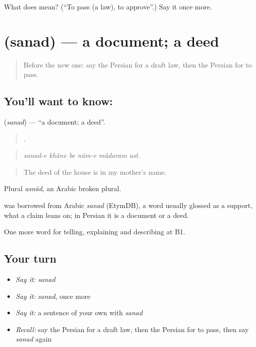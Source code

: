 \begin{tcolorbox}[breakable,colback=teal!4,colframe=teal!35!black,title={Before you move on}]
What does   mean? (\textquotedblleft{}To pass (a law), to approve\textquotedblright{}.) Say it once more.
\end{tcolorbox}
\section[\texorpdfstring{\fa{سند} (sanad)}{سند (sanad)}]{ (sanad) — a document; a deed}

\label{lesson:FA-C410-sanad}



\begin{quote}
Before the new one: say the Persian for a draft law, then the Persian for to pass.
\end{quote}

\subsection*{You'll want to know: }
\textbf{} (\emph{sanad}) — \textquotedblleft{}a document; a deed\textquotedblright{}.

\begin{quote}
     .
\end{quote}

\begin{quote}
\emph{sanad-e khâne be nâm-e mâdaram ast.}
\end{quote}

\begin{quote}
The deed of the house is in my mother's name.
\end{quote}

Plural \emph{asnâd}, an Arabic broken plural.

\begin{cousinweb}
\textbf{} was borrowed from Arabic \emph{sanad} (EtymDB), a word usually glossed as a support, what a claim leans on; in Persian it is a document or a deed.
\end{cousinweb}

\begin{grammarlens}[title={What you've built}]
One more word for telling, explaining and describing at B1.
\end{grammarlens}

\subsection*{Your turn}
\begin{itemize}
\raggedright
  \item \emph{Say it:} \emph{sanad}
  \item \emph{Say it:} \emph{sanad}, once more
  \item \emph{Say it:} a sentence of your own with \emph{sanad}
  \item \emph{Recall:} say the Persian for a draft law, then the Persian for to pass, then say \emph{sanad} again
\end{itemize}


